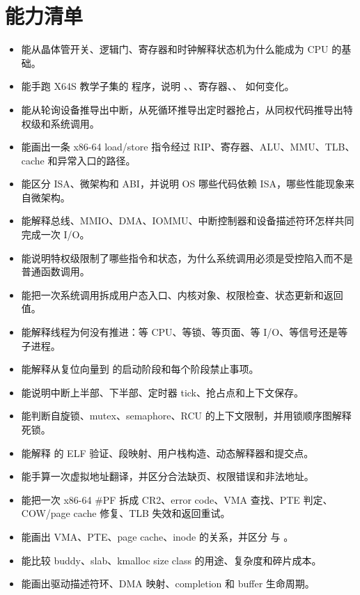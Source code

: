 \chapter*{能力清单}

\begin{rubricbox}
\begin{itemize}
\tightlist
\item 能从晶体管开关、逻辑门、寄存器和时钟解释状态机为什么能成为 CPU 的基础。
\item 能手跑 X64S 教学子集的  程序，说明 、、寄存器、、 如何变化。
\item 能从轮询设备推导出中断，从死循环推导出定时器抢占，从同权代码推导出特权级和系统调用。
\item 能画出一条 x86-64 load/store 指令经过 RIP、寄存器、ALU、MMU、TLB、cache 和异常入口的路径。
\item 能区分 ISA、微架构和 ABI，并说明 OS 哪些代码依赖 ISA，哪些性能现象来自微架构。
\item 能解释总线、MMIO、DMA、IOMMU、中断控制器和设备描述符环怎样共同完成一次 I/O。
\item 能说明特权级限制了哪些指令和状态，为什么系统调用必须是受控陷入而不是普通函数调用。
\item 能把一次系统调用拆成用户态入口、内核对象、权限检查、状态更新和返回值。
\item 能解释线程为何没有推进：等 CPU、等锁、等页面、等 I/O、等信号还是等子进程。
\item 能解释从复位向量到  的启动阶段和每个阶段禁止事项。
\item 能说明中断上半部、下半部、定时器 tick、抢占点和上下文保存。
\item 能判断自旋锁、mutex、semaphore、RCU 的上下文限制，并用锁顺序图解释死锁。
\item 能解释  的 ELF 验证、段映射、用户栈构造、动态解释器和提交点。
\item 能手算一次虚拟地址翻译，并区分合法缺页、权限错误和非法地址。
\item 能把一次 x86-64 \#PF 拆成 CR2、error code、VMA 查找、PTE 判定、COW/page cache 修复、TLB 失效和返回重试。
\item 能画出 VMA、PTE、page cache、inode 的关系，并区分  与 。
\item 能比较 buddy、slab、kmalloc size class 的用途、复杂度和碎片成本。
\item 能画出驱动描述符环、DMA 映射、completion 和 buffer 生命周期。

\end{itemize}
\end{rubricbox}
